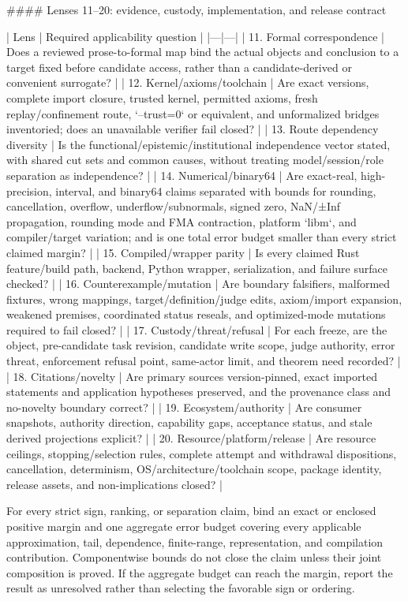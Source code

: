 \documentclass[11pt]{article}
\begin{document}
\begin{markdown}
#### Lenses 11--20: evidence, custody, implementation, and release contract

| Lens | Required applicability question |
|---|---|
| 11. Formal correspondence | Does a reviewed prose-to-formal map bind the actual objects and conclusion to a target fixed before candidate access, rather than a candidate-derived or convenient surrogate? |
| 12. Kernel/axioms/toolchain | Are exact versions, complete import closure, trusted kernel, permitted axioms, fresh replay/confinement route, `--trust=0` or equivalent, and unformalized bridges inventoried; does an unavailable verifier fail closed? |
| 13. Route dependency diversity | Is the functional/epistemic/institutional independence vector stated, with shared cut sets and common causes, without treating model/session/role separation as independence? |
| 14. Numerical/binary64 | Are exact-real, high-precision, interval, and binary64 claims separated with bounds for rounding, cancellation, overflow, underflow/subnormals, signed zero, NaN/±Inf propagation, rounding mode and FMA contraction, platform `libm`, and compiler/target variation; and is one total error budget smaller than every strict claimed margin? |
| 15. Compiled/wrapper parity | Is every claimed Rust feature/build path, backend, Python wrapper, serialization, and failure surface checked? |
| 16. Counterexample/mutation | Are boundary falsifiers, malformed fixtures, wrong mappings, target/definition/judge edits, axiom/import expansion, weakened premises, coordinated status reseals, and optimized-mode mutations required to fail closed? |
| 17. Custody/threat/refusal | For each freeze, are the object, pre-candidate task revision, candidate write scope, judge authority, error threat, enforcement refusal point, same-actor limit, and theorem need recorded? |
| 18. Citations/novelty | Are primary sources version-pinned, exact imported statements and application hypotheses preserved, and the provenance class and no-novelty boundary correct? |
| 19. Ecosystem/authority | Are consumer snapshots, authority direction, capability gaps, acceptance status, and stale derived projections explicit? |
| 20. Resource/platform/release | Are resource ceilings, stopping/selection rules, complete attempt and withdrawal dispositions, cancellation, determinism, OS/architecture/toolchain scope, package identity, release assets, and non-implications closed? |

For every strict sign, ranking, or separation claim, bind an exact or enclosed positive margin and
one aggregate error budget covering every applicable approximation, tail, dependence, finite-range,
representation, and compilation contribution. Componentwise bounds do not close the claim unless
their joint composition is proved. If the aggregate budget can reach the margin, report the result
as unresolved rather than selecting the favorable sign or ordering.


\end{markdown}
\end{document}
